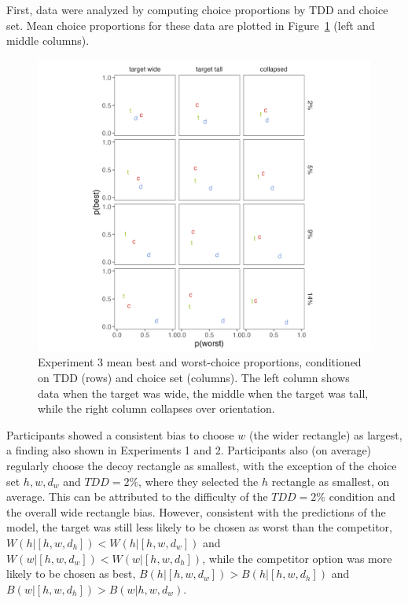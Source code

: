 First, data were analyzed by computing choice proportions by TDD and choice set. Mean choice proportions for these data are plotted in Figure~\ref{fig:bw_mean_choice} (left and middle columns). 

\begin{figure}
   \includegraphics[width=170mm]{figures/crit_mean_props.jpeg}
   \caption{Experiment 3 mean best and worst-choice proportions, conditioned on TDD (rows) and choice set (columns). The left column shows data when the target was wide, the middle when the target was tall, while the right column collapses over orientation.}
   \label{fig:bw_mean_choice}
\end{figure}

Participants showed a consistent bias to choose $w$ (the wider rectangle) as largest, a finding also shown in Experiments 1 and 2. Participants also (on average) regularly choose the decoy rectangle as smallest, with the exception of the choice set $h,w,d_{w}$ and $TDD=2\%$, where they selected the $h$ rectangle as smallest, on average. This can be attributed to the difficulty of the $TDD=2\%$ condition and the overall wide rectangle bias. However, consistent with the predictions of the model, the target was still less likely to be chosen as worst than the competitor, $W(h|[h,w,d_{h}])<W(h|[h,w,d_{w}])$ and $W(w|[h,w,d_{w}])<W(w|[h,w,d_{h}])$, while the competitor option was more likely to be chosen as best, $B(h|[h,w,d_{w}])>B(h|[h,w,d_{h}])$ and $B(w|[h,w,d_{h}])>B(w|{h,w,d_{w}})$. 

